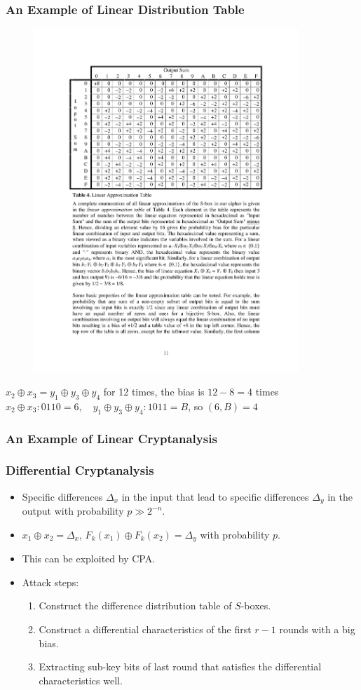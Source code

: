 \begin{frame}\frametitle{An Example of Linear Distribution Table}
\begin{figure}
\begin{center}
\includegraphics[width=100mm]{pic/linear-table} 
\end{center}
\end{figure}
$x_{2}\oplus x_{3} = y_{1}\oplus y_{3} \oplus y_{4}$ for 12 times, the bias is $12 - 8 =4$ times
$x_{2}\oplus x_{3}: 0110 = 6,\quad y_{1}\oplus y_{3} \oplus y_{4}: 1011=B$, so $(6, B) =4$
\end{frame}
\begin{frame}\frametitle{An Example of Linear Cryptanalysis}
\begin{figure}
\begin{center}

\end{center}
\end{figure}
\end{frame}
\begin{frame}\frametitle{Differential Cryptanalysis}
\begin{itemize}
\item Specific differences $\Delta_x$ in the input that lead to specific differences $\Delta_y$ in the output with probability $p \gg 2^{-n}$.
\item $x_1\oplus x_2=\Delta_x$, $F_k(x_1) \oplus F_k(x_2)=\Delta_y$ with probability $p$.
\item This can be exploited by CPA.
\item Attack steps:
\begin{enumerate}
\item Construct the difference distribution table of $S$-boxes.
\item Construct a differential characteristics of the first $r-1$ rounds with a big bias.
\item Extracting sub-key bits of last round that satisfies the differential characteristics well.
\end{enumerate}
\end{itemize}
\end{frame}
